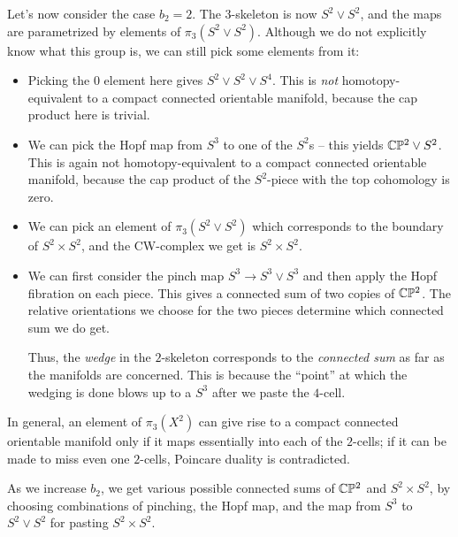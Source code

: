 \documentclass[a4paper]{amsart}
\begin{document}
Let's now consider the case $b_2 = 2$. The $3$-skeleton is now $S^2
\vee S^2$, and the maps are parametrized by elements of $\pi_3(S^2
\vee S^2)$. Although we do not explicitly know what this group is,
we can still pick some elements from it:

\begin{itemize}

\item Picking the $0$ element here gives $S^2 \vee S^2 \vee S^4$. This
  is {\em not} homotopy-equivalent to a compact connected orientable
  manifold, because the cap product here is trivial.

\item We can pick the Hopf map from $S^3$ to one of the $S^2$s -- this
  yields $\mathbb{C}\mathbb{P}^2 \vee S^2$. This is again not
  homotopy-equivalent to a compact connected orientable manifold,
  because the cap product of the $S^2$-piece with the top cohomology is zero.

\item We can pick an element of $\pi_3(S^2 \vee S^2)$ which
  corresponds to the boundary of $S^2 \times S^2$, and the CW-complex
  we get is $S^2 \times S^2$.

\item We can first consider the pinch map $S^3 \to S^3 \vee S^3$ and
  then apply the Hopf fibration on each piece. This gives a connected
  sum of two copies of $\mathbb{C}\mathbb{P}^2$. The relative orientations we
  choose for the two pieces determine which connected sum we do get.

  Thus, the {\em wedge} in the $2$-skeleton corresponds to the {\em
    connected sum} as far as the manifolds are concerned. This is
  because the ``point'' at which the wedging is done blows up to a
  $S^3$ after we paste the $4$-cell.

\end{itemize}

In general, an element of $\pi_3(X^2)$ can give rise to a compact
connected orientable manifold only if it maps essentially into each of
the $2$-cells; if it can be made to miss even one $2$-cells, Poincare
duality is contradicted.

As we increase $b_2$, we get various possible connected sums of
$\mathbb{C}\mathbb{P}^2$ and $S^2 \times S^2$, by choosing combinations of
pinching, the Hopf map, and the map from $S^3$ to $S^2 \vee S^2$ for
pasting $S^2 \times S^2$.




\printindex
\end{document}
